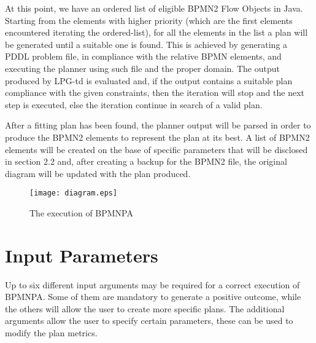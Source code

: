 At this point, we have an ordered list of eligible BPMN2 Flow Objects in Java. 
Starting from the elements with higher priority (which are the first elements encountered iterating the ordered-list), for all the elements in the list a plan will be generated until a suitable one is found. 
This is achieved by generating a PDDL problem file, in compliance with the relative BPMN elements, and executing the planner using such file and the proper domain. 
The output produced by LPG-td is evaluated and, if the output contains a suitable plan compliance with the given constraints, then the iteration will stop and the next step is executed, else the iteration continue in search of a valid plan.

After a fitting plan has been found, the planner output will be parsed in order to produce the BPMN2 elements to represent the plan at its best. A list of BPMN2 elements will be created on the base of specific parameters that will be disclosed in section 2.2 and, after creating a backup for the BPMN2 file, the original diagram will be updated with the plan produced.

\begin{center}
\begin{figure}[h!]
		\centerline{\texttt{[image: diagram.eps]}}
		\caption{The execution of BPMNPA}
\end{figure}
\end{center}

\newpage

\section{Input Parameters}
\label{sec:456}

Up to six different input arguments may be required for a correct execution of BPMNPA.
Some of them are mandatory to generate a positive outcome, while the others will allow the user to create more specific plans. The additional arguments allow the user to specify certain parameters, these can be used to modify the plan metrics. 

